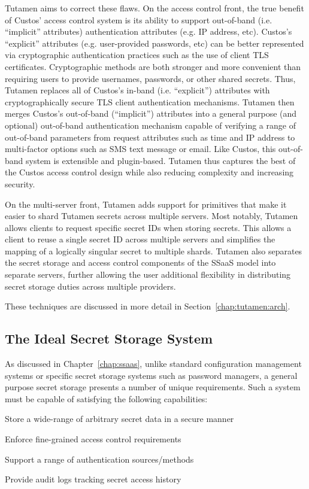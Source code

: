 Tutamen aims to correct these flaws. On the access control front, the
true benefit of Custos' access control system is its ability to
support out-of-band (i.e. ``implicit'' attributes) authentication
attributes (e.g. IP address, etc). Custos's ``explicit'' attributes
(e.g. user-provided passwords, etc) can be better represented via
cryptographic authentication practices such as the use of client TLS
certificates. Cryptographic methods are both stronger and more
convenient than requiring users to provide usernames, passwords, or
other shared secrets. Thus, Tutamen replaces all of Custos's in-band
(i.e. ``explicit'') attributes with cryptographically secure TLS
client authentication mechanisms. Tutamen then merges Custos's
out-of-band (``implicit'') attributes into a general purpose (and
optional) out-of-band authentication mechanism capable of verifying a
range of out-of-band parameters from request attributes such as time
and IP address to multi-factor options such as SMS text message or
email. Like Custos, this out-of-band system is extensible and
plugin-based. Tutamen thus captures the best of the Custos access
control design while also reducing complexity and increasing security.

On the multi-server front, Tutamen adds support for primitives that
make it easier to shard Tutamen secrets across multiple servers. Most
notably, Tutamen allows clients to request specific secret IDs when
storing secrets. This allows a client to reuse a single secret ID
across multiple servers and simplifies the mapping of a logically
singular secret to multiple shards. Tutamen also separates the secret
storage and access control components of the SSaaS model into separate
servers, further allowing the user additional flexibility in
distributing secret storage duties across multiple providers.

These techniques are discussed in more detail in
Section~\ref{chap:tutamen:arch}.

\subsection{The Ideal Secret Storage System}

As discussed in Chapter~\ref{chap:ssaas}, unlike standard
configuration management systems or specific secret storage systems
such as password managers, a general purpose secret storage presents a
number of unique requirements. Such a system must be capable of
satisfying the following capabilities:

\begin{packed_item}
\item Store a wide-range of arbitrary secret data in a secure manner
\item Enforce fine-grained access control requirements
\item Support a range of authentication sources/methods
\item Provide audit logs tracking secret access history
\end{packed_item}

